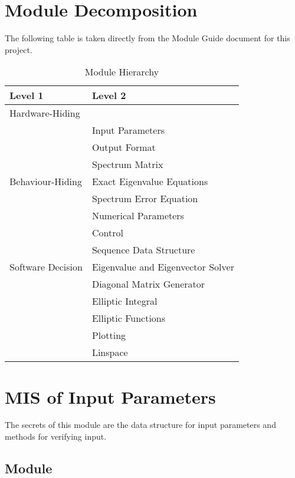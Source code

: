 \documentclass[12pt, titlepage]{article}
\begin{document}
\section{Module Decomposition}

The following table is taken directly from the Module Guide document for this project.

\begin{table}[h!]
\centering
\begin{tabular}{p{} p{}}
\toprule
\textbf{Level 1} & \textbf{Level 2}\\
\midrule

{Hardware-Hiding} & ~ \\
\midrule

\multirow{7}{0.3\textwidth}{Behaviour-Hiding} 
& Input Parameters \\
& Output Format \\
& Spectrum Matrix \\
& Exact Eigenvalue Equations \\
& Spectrum Error Equation \\
& Numerical Parameters \\  
& Control \\ 
\midrule

\multirow{3}{0.3\textwidth}{Software Decision} & {Sequence Data Structure}\\
& Eigenvalue and Eigenvector Solver \\
& Diagonal Matrix Generator\\
& Elliptic Integral\\ 
& Elliptic Functions\\ 
& Plotting \\ 
& Linspace \\
\bottomrule

\end{tabular}
\caption{Module Hierarchy}
\label{TblMH}
\end{table}

\newpage

\section{MIS of Input Parameters} \label{IPM} 

The secrets of this module are the data structure for input parameters and 
methods for verifying input. 

\subsection{Module}
\end{document}
